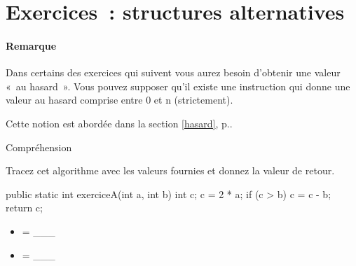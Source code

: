 \clearpage
\section{Exercices~: structures alternatives}			

\begin{Emphase}
	
	\paragraph{Remarque} Dans certains des exercices qui suivent vous aurez
	besoin d'obtenir une valeur «~au hasard~». Vous pouvez supposer qu'il existe
	une instruction  qui donne une valeur au hasard comprise entre
	0 et n (strictement).

	Cette notion est abordée dans la section \ref{hasard}, p.\pageref{hasard}.

\end{Emphase}

\begin{Exercice}{Compréhension}
		
	Tracez cet algorithme avec les valeurs fournies et donnez la valeur de
	retour.

	\begin{java}
public static int exerciceA(int a, int b){
	int c;
	c = 2 * a;
	if (c > b){
		c = c - b;
	}
	return c;
}
	\end{java}	
\begin{multicols}{2}
	\begin{itemize}
		\item {} = \_\_\_
		\item {} = \_\_\_
	\end{itemize}
\end{multicols}	
	\end{Exercice}


